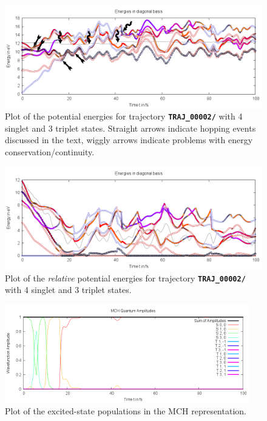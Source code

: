 \documentclass[a4paper,11pt,DIV=15,openany]{scrbook}
\newcommand{\ttt}[1]{\textbf{\texttt{#1}}}
\begin{document}
\begin{figure}[tb]
  \centering
  \includegraphics[width=\textwidth]{figures/energy.png}
  \caption{Plot of the potential energies for trajectory \ttt{TRAJ\_00002/} with 4 singlet and 3 triplet states. Straight arrows indicate hopping events discussed in the text, wiggly arrows indicate problems with energy conservation/continuity. }
  \label{fig:en}
\end{figure}
\begin{figure}[tb]
  \centering
  \includegraphics[width=\textwidth]{figures/energy_rel.png}
  \caption{Plot of the \emph{relative} potential energies for trajectory \ttt{TRAJ\_00002/} with 4 singlet and 3 triplet states.  }
  \label{fig:en_rel}
\end{figure}
\begin{figure}[p]
  \centering
  \includegraphics[width=0.95\textwidth]{figures/coeff_MCH.png}
  \caption{Plot of the excited-state populations in the MCH representation.}
  \label{fig:cMCH}
\end{figure}
\end{document}
